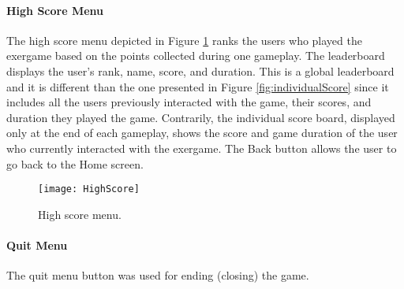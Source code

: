 \paragraph{High Score Menu}
The high score menu depicted in Figure \ref{fig:highscore} ranks the users who played the exergame based on the points collected during one gameplay. The leaderboard displays the user's rank, name, score, and duration. This is a global leaderboard and it is different than the one presented in Figure \ref{fig:individualScore} since it includes all the users previously interacted with the game, their scores, and duration they played the game. Contrarily, the individual score board, displayed only at the end of each gameplay, shows the score and game duration of the user who currently interacted with the exergame. The Back button allows the user to go back to the Home screen.
\begin{figure}[h]
    \centering
    \texttt{[image: HighScore]}
    \caption{High score menu.}
    \label{fig:highscore}
\end{figure}
\paragraph{Quit Menu}
The quit menu button was used for ending (closing) the game. 
